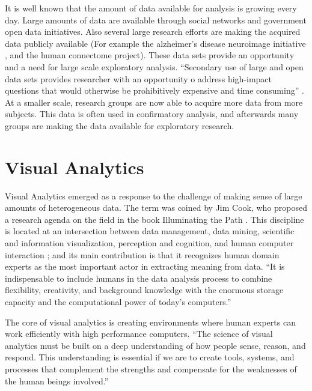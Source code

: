 It is well known that the amount of data available for analysis is growing every day. Large amounts of data are available through social networks and government open data initiatives. Also several large research efforts are making the acquired data publicly available (For example the alzheimer's disease neuroimage initiative \autocite{jack_alzheimers_2008}, and the human connectome project\autocite{marcus_human_2013}). These data sets provide an opportunity and a need for large scale exploratory analysis. ``Secondary use of large and open data sets provides researcher with an opportunity o address high-impact questions that would otherwise be prohibitively expensive and time consuming'' \autocite{viangteeravat_giving_2014}. At a smaller scale, research groups are now able to acquire more data from more subjects. This data is often used in confirmatory analysis, and afterwards many groups are making the data available for exploratory research. 

\section{Visual Analytics}

%

Visual Analytics emerged as a response to the challenge of making sense of large amounts of heterogeneous data. The term was coined by Jim Cook, who proposed a research agenda on the field in the book Illuminating the Path \autocite{cook_illuminating_2005}. This discipline is located at an intersection between data management, data mining, scientific and information visualization, perception and cognition, and human computer interaction \autocite{keim_visual_2008}; and its main contribution is that it recognizes human domain experts as the most important actor in extracting meaning from data.
``It is indispensable to include humans in the data analysis process to combine flexibility, creativity, and background knowledge with the enormous storage capacity and the computational power of today’s computers.'' \autocite{keim_visual_2008}

The core of visual analytics is creating environments where human experts can work efficiently with high performance computers.
``The science of visual analytics must be built on a deep understanding of how
people sense, reason, and respond. This understanding is essential if we are to create
tools, systems, and processes that complement the strengths and compensate for the
weaknesses of the human beings involved.'' \autocite{cook_illuminating_2005}

